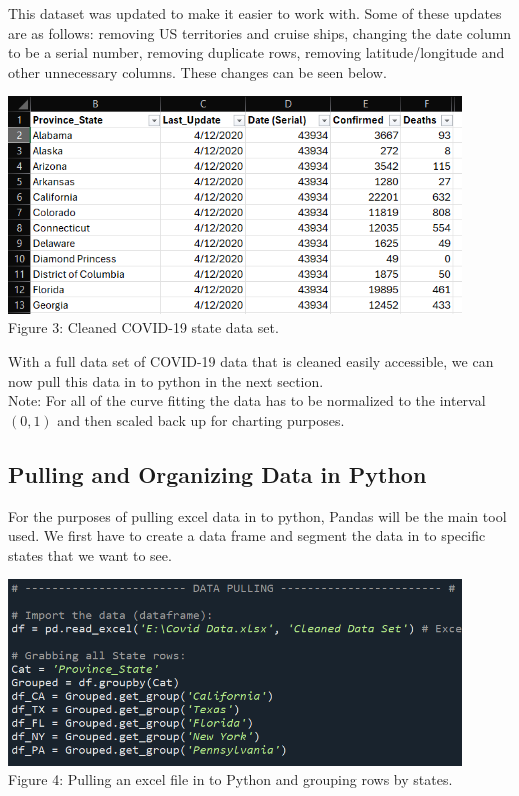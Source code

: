 \documentclass[12pt]{article}
\begin{document}
\noindent This dataset was updated to make it easier to work with. Some of these updates are as follows: removing US territories and cruise ships, changing the date column to be a serial number, removing duplicate rows, removing latitude/longitude and other unnecessary columns. These changes can be seen below.

\begin{center}
\includegraphics[width = 0.9\textwidth]{clean data.png} \\
Figure 3: Cleaned COVID-19 state data set.
\end{center}

\noindent With a full data set of COVID-19 data that is cleaned easily accessible, we can now pull this data in to python in the next section. \\

\noindent Note: For all of the curve fitting the data has to be normalized to the interval $(0,1)$ and then scaled back up for charting purposes.

\pagebreak

\subsection{Pulling and Organizing Data in Python}
\noindent For the purposes of pulling excel data in to python, Pandas will be the main tool used. We first have to create a data frame and segment the data in to specific states that we want to see.

\begin{center}
\includegraphics[width = 0.9\textwidth]{data pulling1.png} \\
Figure 4: Pulling an excel file in to Python and grouping rows by states.
\end{center}
\end{document}
